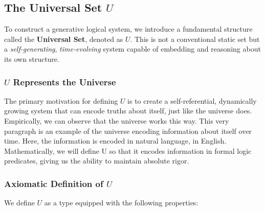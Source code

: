 \documentclass[12pt]{article}
\begin{document}
\subsection{The Universal Set \( U \)}

To construct a generative logical system, we introduce a fundamental structure called the \textbf{Universal Set}, denoted as \( U \). This is not a conventional static set but a \textit{self-generating}, \textit{time-evolving} system capable of embedding and reasoning about its own structure.

\subsubsection{\(U\) Represents the Universe}
The primary motivation for defining $U$ is to create a self-referential, dynamically growing system that can encode truths about itself, just like the universe does. Empirically, we can observe that the universe works this way. This very paragraph is an example of the universe encoding information about itself over time. Here, the information is encoded in natural language, in English. Mathematically, we will define U so that it encodes information in formal logic predicates, giving us the ability to maintain absolute rigor.

\subsubsection{Axiomatic Definition of \( U \)}

We define \( U \) as a type equipped with the following properties:
\end{document}
